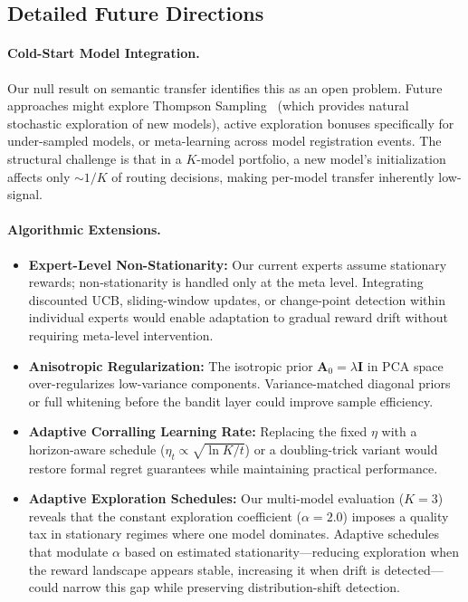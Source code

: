 
\subsection{Detailed Future Directions}
\label{sec:future_work_detailed}

\paragraph{Cold-Start Model Integration.}
Our null result on semantic transfer identifies this as an open problem. Future approaches might explore Thompson Sampling~\cite{agrawal2013thompson} (which provides natural stochastic exploration of new models), active exploration bonuses specifically for under-sampled models, or meta-learning across model registration events. The structural challenge is that in a $K$-model portfolio, a new model's initialization affects only ${\sim}1/K$ of routing decisions, making per-model transfer inherently low-signal.

\paragraph{Algorithmic Extensions.}
\begin{itemize}
    \item \textbf{Expert-Level Non-Stationarity:} Our current experts assume stationary rewards; non-stationarity is handled only at the meta level. Integrating discounted UCB, sliding-window updates, or change-point detection within individual experts would enable adaptation to gradual reward drift without requiring meta-level intervention.
    \item \textbf{Anisotropic Regularization:} The isotropic prior $\mathbf{A}_0 = \lambda \mathbf{I}$ in PCA space over-regularizes low-variance components. Variance-matched diagonal priors or full whitening before the bandit layer could improve sample efficiency.
    \item \textbf{Adaptive Corralling Learning Rate:} Replacing the fixed $\eta$ with a horizon-aware schedule ($\eta_t \propto \sqrt{\ln K / t}$) or a doubling-trick variant would restore formal regret guarantees while maintaining practical performance.
    \item \textbf{Adaptive Exploration Schedules:} Our multi-model evaluation ($K{=}3$) reveals that the constant exploration coefficient ($\alpha{=}2.0$) imposes a quality tax in stationary regimes where one model dominates. Adaptive schedules that modulate $\alpha$ based on estimated stationarity---reducing exploration when the reward landscape appears stable, increasing it when drift is detected---could narrow this gap while preserving distribution-shift detection.
\end{itemize}

